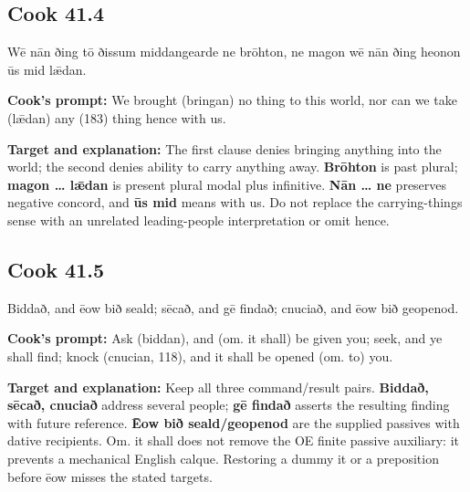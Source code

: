 \par\begin{minipage}{\linewidth}\raggedright
\subsection*{Cook 41.4}

Wē nān ðing tō ðissum middangearde ne brōhton, ne magon wē nān ðing heonon ūs mid lǣdan.

\textbf{Cook's prompt:} We brought (bringan) no thing to this world, nor can we take (lǣdan) any (183) thing hence with us.

\textbf{Target and explanation:} The first clause denies bringing anything into the world; the second denies ability to carry anything away. \textbf{Brōhton} is past plural; \textbf{magon … lǣdan} is present plural modal plus infinitive. \textbf{Nān … ne} preserves negative concord, and \textbf{ūs mid} means with us. Do not replace the carrying-things sense with an unrelated leading-people interpretation or omit hence.

\end{minipage}\par\addvspace{4pt}

\par\begin{minipage}{\linewidth}\raggedright
\subsection*{Cook 41.5}

Biddað, and ēow bið seald; sēcað, and gē findað; cnuciað, and ēow bið geopenod.

\textbf{Cook's prompt:} Ask (biddan), and (om. it shall) be given you; seek, and ye shall find; knock (cnucian, 118), and it shall be opened (om. to) you.

\textbf{Target and explanation:} Keep all three command/\allowbreak{}result pairs. \textbf{Biddað, sēcað, cnuciað} address several people; \textbf{gē findað} asserts the resulting finding with future reference. \textbf{Ēow bið seald/\allowbreak{}geopenod} are the supplied passives with dative recipients. Om. it shall does not remove the OE finite passive auxiliary: it prevents a mechanical English calque. Restoring a dummy it or a preposition before ēow misses the stated targets.

\end{minipage}\par\addvspace{4pt}

